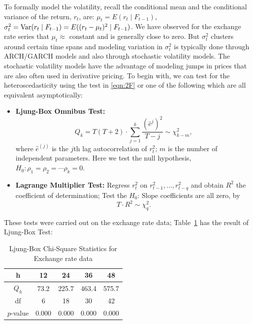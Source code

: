 To formally model the volatility, recall the conditional mean and the conditional variance of the return, $r_t$, are: $\mu_t = E(r_t \;|\; F_{t-1})$, $\sigma_t^2 = \operatorname{Var}(r_t \;|\; F_{t-1}) = E( (r_t - \mu_t)^2 \;|\; F_{t-1})$. We have observed for the exchange rate series that $\mu_t \approx$ constant and is generally close to zero. But $\sigma_t^2$ clusters around certain time spans and modeling variation in $\sigma_t^2$ is typically done through ARCH/GARCH models and also through stochastic volatility models. The stochastic volatility models have the advantage of modeling jumps in prices that are also often used in derivative pricing. To begin with, we can test for the heteroscedasticity using the test in \eqref{eqn:2F} or one of the following which are all equivalent asymptotically:


\begin{itemize}
\item \textbf{Ljung-Box Omnibus Test:}
	\begin{equation} \label{eqn:2Qk}
	Q_k = T(T+2) \cdot \sum_{j=1}^k\frac{(\hat{e}^{j})^2}{T - j} \sim \chi_{k-m}^2,
	\end{equation}
where $\hat{e}^{(j)}$ is the $j$th lag autocorrelation of $r_t^2$; $m$ is the number of independent parameters. Here we test the null hypothesis, $H_0: \rho_1 = \rho_2 = \cdots \rho_k = 0$.

\item \textbf{Lagrange Multiplier Test:} Regress $r_t^2$ on $r_{t-1}^2, \ldots, r_{t-q}^2$ and obtain $R^2$ the coefficient of determination; Test the $H_0$: Slope coefficients are all zero, by
	\begin{equation} \label{eqn:2TstarR}
	T \cdot R^2 \sim \chi_q^2.
	\end{equation}
\end{itemize}


These tests were carried out on the exchange rate data; Table~\ref{tab:box} has the result of Ljung-Box Test: 
        \begin{table}[!ht]
        \centering
        \caption{Ljung-Box Chi-Square Statistics for Exchange rate data \label{tab:box}}
        	\begin{tabular}{ccccc}
        	 h & 12 & 24 & 36 & 48 \\ \hline
        	$Q_h$ & 73.2 & 225.7 & 463.4 & 575.7 \\ \hline
        	df & 6 & 18 & 30 & 42 \\ \hline
        	$p$-value & 0.000 & 0.000 & 0.000 & 0.000 \\
        \end{tabular}
        \end{table}


